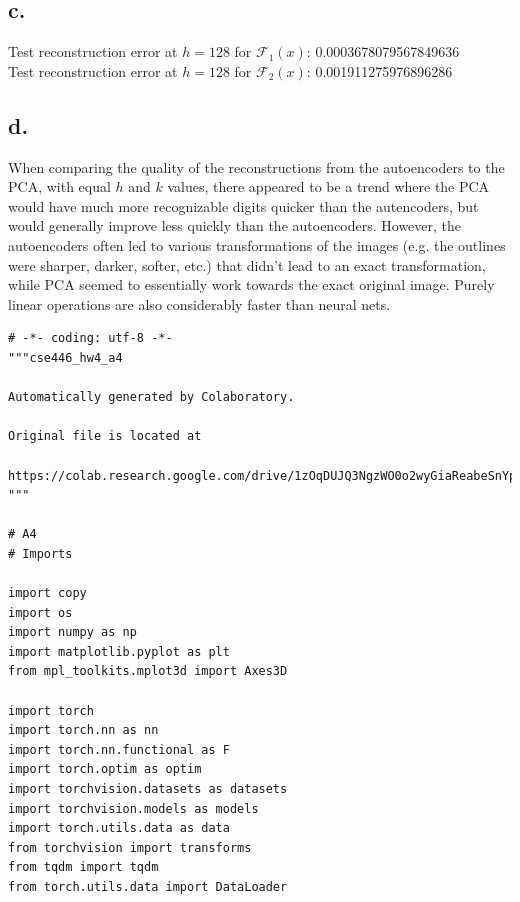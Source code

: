 \documentclass{article}
\newcommand{\1}{\mathbf{1}}
\begin{document}
{\subsection*{c.}


Test reconstruction error at $h = 128$ for $\mathcal{F}_1(x)$: 0.0003678079567849636 \\
Test reconstruction error at $h = 128$ for $\mathcal{F}_2(x)$: 0.001911275976896286

\subsection*{d.}


When comparing the quality of the reconstructions from the autoencoders to the PCA, with equal $h$ and $k$ values, there appeared to be a trend where the PCA would have much more recognizable digits quicker than the autencoders, but would generally improve less quickly than the autoencoders. However, the autoencoders often led to various transformations of the images (e.g. the outlines were sharper, darker, softer, etc.) that didn't lead to an exact transformation, while PCA seemed to essentially work towards the exact original image. Purely linear operations are also considerably faster than neural nets.

\newpage

\begin{verbatim}
# -*- coding: utf-8 -*-
"""cse446_hw4_a4

Automatically generated by Colaboratory.

Original file is located at
    https://colab.research.google.com/drive/1zOqDUJQ3NgzWO0o2wyGiaReabeSnYpyO
"""

# A4
# Imports

import copy
import os
import numpy as np
import matplotlib.pyplot as plt
from mpl_toolkits.mplot3d import Axes3D

import torch
import torch.nn as nn
import torch.nn.functional as F
import torch.optim as optim
import torchvision.datasets as datasets
import torchvision.models as models
import torch.utils.data as data
from torchvision import transforms
from tqdm import tqdm
from torch.utils.data import DataLoader


\end{verbatim}}
\end{document}
